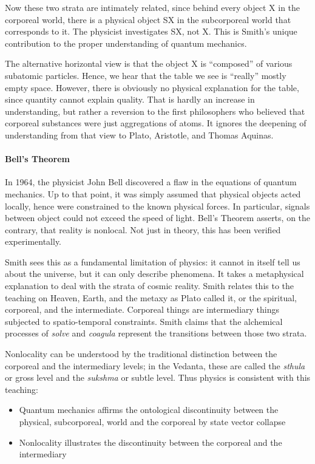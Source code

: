 Now these two strata are intimately related, since behind every object X in the corporeal world, there is a physical object SX in the subcorporeal world that corresponds to it. The physicist investigates SX, not X. This is Smith's unique contribution to the proper understanding of quantum mechanics.

The alternative horizontal view is that the object X is ``composed'' of various subatomic particles. Hence, we hear that the table we see is ``really'' mostly empty space. However, there is obviously no physical explanation for the table, since quantity cannot explain quality. That is hardly an increase in understanding, but rather a reversion to the first philosophers who believed that corporeal substances were just aggregations of atoms. It ignores the deepening of understanding from that view to Plato, Aristotle, and Thomas Aquinas.

\paragraph{Bell's Theorem}


In 1964, the physicist John Bell discovered a flaw in the equations of quantum mechanics. Up to that point, it was simply assumed that physical objects acted locally, hence were constrained to the known physical forces. In particular, signals between object could not exceed the speed of light. Bell's Theorem asserts, on the contrary, that reality is nonlocal. Not just in theory, this has been verified experimentally.

Smith sees this as a fundamental limitation of physics: it cannot in itself tell us about the universe, but it can only describe phenomena. It takes a metaphysical explanation to deal with the strata of cosmic reality. Smith relates this to the teaching on Heaven, Earth, and the metaxy as Plato called it, or the spiritual, corporeal, and the intermediate. Corporeal things are intermediary things subjected to spatio-temporal constraints. Smith claims that the alchemical processes of \emph{solve} and \emph{coagula} represent the transitions between those two strata.

Nonlocality can be understood by the traditional distinction between the corporeal and the intermediary levels; in the Vedanta, these are called the \emph{sthula} or gross level and the \emph{sukshma} or subtle level. Thus physics is consistent with this teaching:

\begin{itemize}


\item Quantum mechanics affirms the ontological discontinuity between the physical, subcorporeal, world and the corporeal by state vector collapse

\item Nonlocality illustrates the discontinuity between the corporeal and the intermediary
\end{itemize}


